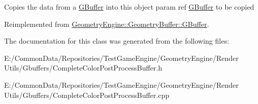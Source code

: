 Copies the data from a \mbox{\hyperlink{class_geometry_engine_1_1_geometry_buffer_1_1_g_buffer}{G\+Buffer}} into this object param ref \mbox{\hyperlink{class_geometry_engine_1_1_geometry_buffer_1_1_g_buffer}{G\+Buffer}} to be copied 

Reimplemented from \mbox{\hyperlink{class_geometry_engine_1_1_geometry_buffer_1_1_g_buffer_a9f20eb78703ef048d59a54f90ee09f25}{Geometry\+Engine\+::\+Geometry\+Buffer\+::\+G\+Buffer}}.



The documentation for this class was generated from the following files\+:\begin{DoxyCompactItemize}
\item 
E\+:/\+Common\+Data/\+Repositories/\+Test\+Game\+Engine/\+Geometry\+Engine/\+Render Utils/\+Gbuffers/Complete\+Color\+Post\+Process\+Buffer.\+h\item 
E\+:/\+Common\+Data/\+Repositories/\+Test\+Game\+Engine/\+Geometry\+Engine/\+Render Utils/\+Gbuffers/Complete\+Color\+Post\+Process\+Buffer.\+cpp\end{DoxyCompactItemize}
